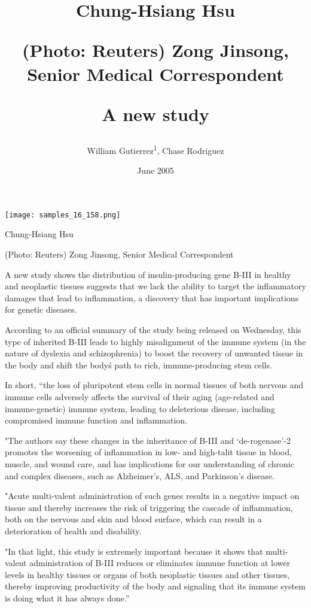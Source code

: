 \documentclass{article}
\title{Chung-Hsiang Hsu

(Photo: Reuters) Zong Jinsong, Senior Medical Correspondent

A new study}
\author{William Gutierrez\textsuperscript{1},  Chase Rodriguez}
\affil{\textsuperscript{1}University of Delaware}
\date{June 2005}
\begin{document}
\maketitle

\begin{center}
\begin{minipage}{0.75\linewidth}
\texttt{[image: samples\_16\_158.png]}
\end{minipage}
\end{center}

Chung-Hsiang Hsu

(Photo: Reuters) Zong Jinsong, Senior Medical Correspondent

A new study shows the distribution of insulin-producing gene B-III in healthy and neoplastic tissues suggests that we lack the ability to target the inflammatory damages that lead to inflammation, a discovery that has important implications for genetic diseases.

According to an official summary of the study being released on Wednesday, this type of inherited B-III leads to highly misalignment of the immune system (in the nature of dyslexia and schizophrenia) to boost the recovery of unwanted tissue in the body and shift the body\'s path to rich, immune-producing stem cells.

In short, “the loss of pluripotent stem cells in normal tissues of both nervous and immune cells adversely affects the survival of their aging (age-related and immune-genetic) immune system, leading to deleterious disease, including compromised immune function and inflammation.

"The authors say these changes in the inheritance of B-III and ‘de-rogenase’-2 promotes the worsening of inflammation in low- and high-talit tissue in blood, muscle, and wound care, and has implications for our understanding of chronic and complex diseases, such as Alzheimer’s, ALS, and Parkinson’s disease.

"Acute multi-valent administration of such genes results in a negative impact on tissue and thereby increases the risk of triggering the cascade of inflammation, both on the nervous and skin and blood surface, which can result in a deterioration of health and disability.

"In that light, this study is extremely important because it shows that multi-valent administration of B-III reduces or eliminates immune function at lower levels in healthy tissues or organs of both neoplastic tissues and other tissues, thereby improving productivity of the body and signaling that its immune system is doing what it has always done.”
\end{document}
